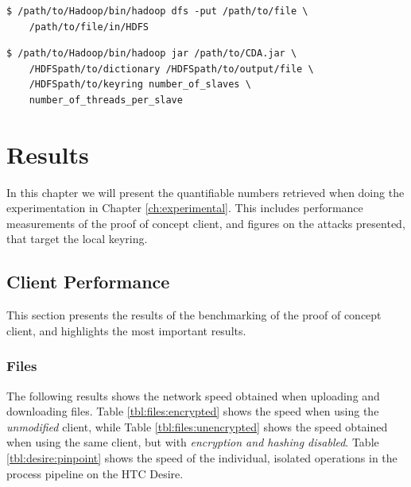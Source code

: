 \documentclass[pdftex,english,10pt,b5paper,twoside]{book}
\begin{document}
\lstset{language=bash, label=lst:cpHDFS, caption=Copying files into HDFS}
\begin{lstlisting}
$ /path/to/Hadoop/bin/hadoop dfs -put /path/to/file \
    /path/to/file/in/HDFS
\end{lstlisting}

\lstset{language=bash, label=lst:CDA, caption=Executing the CDA Attack}
\begin{lstlisting}
$ /path/to/Hadoop/bin/hadoop jar /path/to/CDA.jar \
    /HDFSpath/to/dictionary /HDFSpath/to/output/file \
    /HDFSpath/to/keyring number_of_slaves \
    number_of_threads_per_slave
\end{lstlisting}

\chapter{Results}
\label{ch:results}

In this chapter we will present the quantifiable numbers retrieved when doing
the experimentation in Chapter \ref{ch:experimental}. This includes performance
measurements of the proof of concept client, and figures on the attacks
presented, that target the local keyring.

\section{Client Performance}

This section presents the results of the benchmarking of the proof of concept
client, and highlights the most important results.

\subsection{Files}

The following results shows the network speed obtained when uploading and
downloading files. Table \ref{tbl:files:encrypted} shows the speed when using
the \emph{unmodified} client, while Table \ref{tbl:files:unencrypted} shows the
speed obtained when using the same client, but with \emph{encryption and
hashing disabled}. Table \ref{tbl:desire:pinpoint} shows the speed of the
individual, isolated operations in the process pipeline on the HTC Desire.




\end{document}
